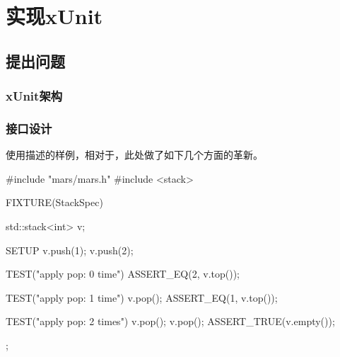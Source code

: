 \begin{savequote}[45mm]
\end{savequote}

\chapter{实现xUnit} 
\label{ch:ice-breaker}

\begin{content}

\end{content}

\section{提出问题}
	
\begin{content}

\subsection{xUnit架构}

\subsection{接口设计}

使用描述的样例，相对于，此处做了如下几个方面的革新。

\begin{enum}
\end{enum}


\begin{leftbar}
 \begin{c++}
#include "mars/mars.h"
#include <stack>

FIXTURE(StackSpec) {
  std::stack<int> v;   

  SETUP {
    v.push(1);
    v.push(2);
  }

  TEST("apply pop: 0 time") {
    ASSERT_EQ(2, v.top());
  }

  TEST("apply pop: 1 time") {
    v.pop();
    ASSERT_EQ(1, v.top());
  }

  TEST("apply pop: 2 times") {
    v.pop();
    v.pop();
    ASSERT_TRUE(v.empty());
  }
}; 
 \end{c++}
\end{leftbar}

\end{content}

